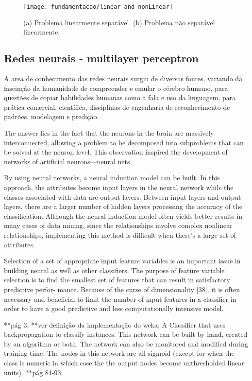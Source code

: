 \begin{figure}[!htb] \centering 
  \centering
  \texttt{[image: fundamentacao/linear\_and\_nonLinear]} 
  \caption{(a) Problema linearmente separável. (b) Problema não separável linearmente.\cite{Elizondo:2006}} 
  \label{fig:slseparablenonseparable}
\end{figure}

\subsection{Redes neurais - multilayer perceptron}
\label{subsec:neuralnetwork}
A area de conhecimento das redes neurais surgiu de diversas fontes, variando da fascinção da humanidade de compreender e emular o cérebro humano, para questões de copiar habilidades humanas como a fala e uso da linguagem, para prática comercial, científica, disciplinas de engenharia de reconhecimento de padrões, modelagem e predição.\cite{Michie:1994}

The answer lies in the fact that the neurons in the brain are massively interconnected, allowing a problem to be decomposed into subproblems that can be solved at the neuron level. This observation inspired the development of networks of artificial neurons—neural nets.\cite{Witten:2005}

By using neural networks, a neural induction model can be built. In this approach, the attributes become input layers in the neural network while the classes associated with data are output layers. Between input layers and output layers, there are a larger number of hidden layers processing the accuracy of the classification. Although the neural induction model often yields better results in many cases of data mining, since the relationships involve complex nonlinear relationships, implementing this method is difficult when there’s a large set of attributes.\cite{Olson:2008}

Selection of a set of appropriate input feature variables is an important issue in building neural as well as other classifiers. The purpose of feature variable selection is to find the smallest set of features that can result in satisfactory predictive perfor- mance. Because of the curse of dimensionality [38], it is often necessary and beneficial to limit the number of input features in a classifier in order to have a good predictive and less computationally intensive model. \cite{Olson:2008}

**pág 3;
**ver definição da implementação do weka;
A Classifier that uses backpropagation to classify instances.
This network can be built by hand, created by an algorithm or both. The network can also be monitored and modified during training time. The nodes in this network are all sigmoid (except for when the class is numeric in which case the the output nodes become unthresholded linear units). 
**pág 84-93;

